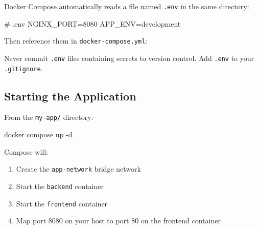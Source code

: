\documentclass[11pt,american,a4paper,openany]{book}
\providecommand{\tightlist}{%
  \setlength{\itemsep}{2pt}\setlength{\parskip}{0pt}}
\newenvironment{Shaded}{}{}
\newcommand{\AttributeTok}[1]{\textcolor[rgb]{0.49,0.56,0.16}{#1}}
\newcommand{\FunctionTok}[1]{\textcolor[rgb]{0.02,0.16,0.49}{#1}}
\newcommand{\KeywordTok}[1]{\textcolor[rgb]{0.00,0.44,0.13}{\textbf{#1}}}
\newcommand{\NormalTok}[1]{#1}
\newcommand{\StringTok}[1]{\textcolor[rgb]{0.25,0.44,0.63}{#1}}
\begin{document}
Docker Compose automatically reads a file named \texttt{.env} in the
same directory:

\begin{Shaded}
\begin{Highlighting}[]
\NormalTok{\# .env}
\NormalTok{NGINX\_PORT=8080}
\NormalTok{APP\_ENV=development}
\end{Highlighting}
\end{Shaded}

Then reference them in \texttt{docker-compose.yml}:

\begin{Shaded}
\end{Shaded}

Never commit \texttt{.env} files containing secrets to version control.
Add \texttt{.env} to your \texttt{.gitignore}.

\subsection{Starting the Application}\label{starting-the-application}

From the \texttt{my-app/} directory:

\begin{Shaded}
\begin{Highlighting}[]
\NormalTok{docker compose up {-}d}
\end{Highlighting}
\end{Shaded}

Compose will:

\begin{enumerate}
\def\labelenumi{\arabic{enumi}.}
\tightlist
\item
  Create the \texttt{app-network} bridge network
\item
  Start the \texttt{backend} container
\item
  Start the \texttt{frontend} container
\item
  Map port 8080 on your host to port 80 on the frontend container
\end{enumerate}
\end{document}
